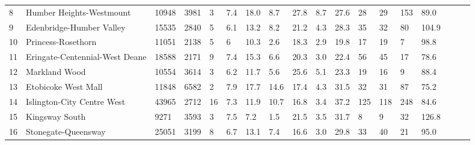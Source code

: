 \documentclass{article}
\begin{document}
\begin{table}[h]
\begin{adjustwidth}{-4cm}{-1cm}
\begin{adjustbox}{width=580}
\begin{tabular}{lllp{40pt}p{55pt}llp{35pt}llllllllll}
                    8  & Humber Heights-Westmount            & 10948      & 3981               & 3                  & 7.4           & 18.0     & 8.7                & 27.8       & 8.7        & 27.6              & 28      & 29      & 153            & 89.0         \\
                    9  & Edenbridge-Humber Valley            & 15535      & 2840               & 5                  & 6.1           & 13.2     & 8.2                & 21.2       & 4.3        & 28.3              & 35      & 32      & 80             & 104.9        \\
                    10 & Princess-Rosethorn                  & 11051      & 2138               & 5                  & 6             & 10.3     & 2.6                & 18.3       & 2.9        & 19.8              & 17      & 19      & 7              & 98.8         \\
                    11 & Eringate-Centennial-West Deane      & 18588      & 2171               & 9                  & 7.4           & 15.3     & 6.6                & 20.3       & 3.0        & 22.4              & 56      & 45      & 17                     & 78.6           \\
                    12 & Markland Wood                       & 10554      & 3614               & 3                  & 6.2           & 11.7     & 5.6                & 25.6       & 5.1        & 23.3              & 19      & 16      & 9              & 88.4         \\
                    13 & Etobicoke West Mall                 & 11848      & 6582               & 2                  & 7.9           & 17.7     & 14.6               & 17.4       & 4.3        & 31.5              & 32      & 31      & 87             & 75.2         \\
                    14 & Islington-City Centre West          & 43965      & 2712               & 16                 & 7.3           & 11.9     & 10.7               & 16.8       & 3.4        & 37.2              & 125     & 118     & 248                    & 84.6           \\
                    15 & Kingsway South                      & 9271       & 3593               & 3                  & 7.5           & 7.2      & 1.5                & 21.5       & 3.5        & 31.7              & 8       & 9       & 32             & 126.8        \\
                    16 & Stonegate-Queensway                 & 25051      & 3199               & 8                  & 6.7           & 13.1     & 7.4                & 16.6       & 3.0        & 29.8              & 33      & 40      & 21             & 95.0         \\

\end{tabular}
\end{adjustbox}
\end{adjustwidth}
\end{table}
\end{document}

